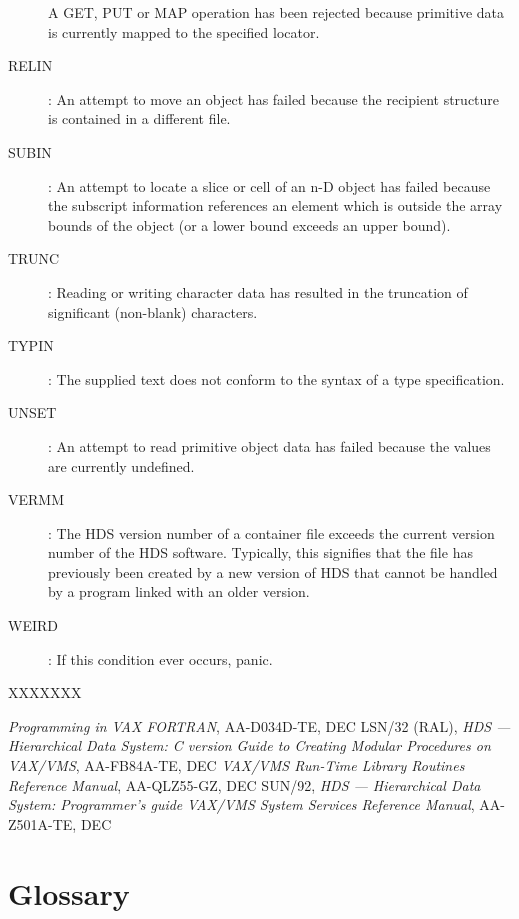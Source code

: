 \begin{description}
A GET, PUT or MAP operation has been rejected because primitive data is
currently mapped to the specified locator.                                  
\item [RELIN]:
An attempt to move an object has failed because the recipient structure is
contained in a different file.
\item [SUBIN]:
An attempt to locate a slice or cell of an n-D object has failed
because the subscript information references an element which is outside the
array bounds of the object (or a lower bound exceeds an upper bound).
\item [TRUNC]:
Reading or writing character data has resulted in the truncation of significant
(non-blank) characters.
\item [TYPIN]:
The supplied text does not conform to the syntax of a type specification.
\item [UNSET]:
An attempt to read primitive object data has failed because the values are
currently undefined.
\item [VERMM]:
The HDS version number of a container file exceeds the current version number
of the HDS software.
Typically, this signifies that the file has previously been created by a new
version of HDS that cannot be handled by a program linked with an older version.
\item [WEIRD]:
If this condition ever occurs, panic.
\end{description}

\begin {thebibliography}{XXXXXXX}
 {\em Programming in VAX FORTRAN},
AA-D034D-TE, DEC                                                      
 LSN/32 (RAL), {\em HDS --- Hierarchical Data System: C
version}
 {\em Guide to Creating Modular
Procedures on VAX/VMS}, AA-FB84A-TE, DEC
 {\em VAX/VMS Run-Time Library
Routines Reference Manual}, AA-QLZ55-GZ, DEC 
 SUN/92, {\em HDS --- Hierarchical Data System:
Programmer's guide} 
 {\em VAX/VMS System Services
Reference Manual}, AA-Z501A-TE, DEC 
\end {thebibliography}

\section* {Glossary}
                      
